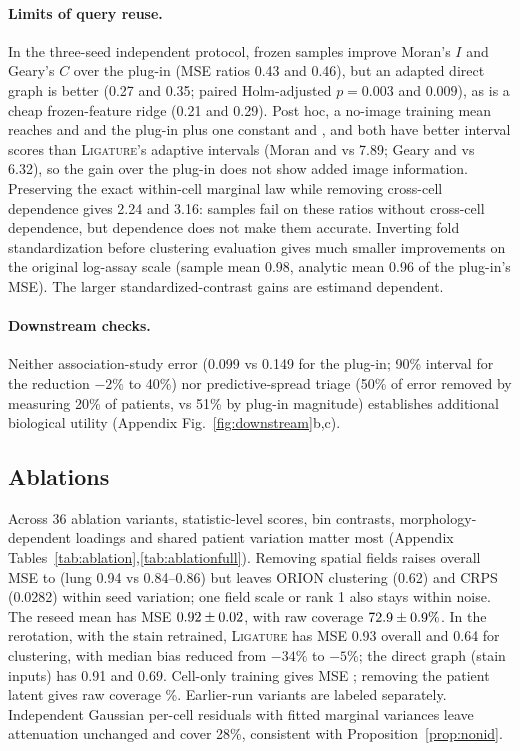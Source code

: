 \documentclass[10pt,letterpaper]{article}
\theoremstyle{definition}
\theoremstyle{remark}
\newcommand{\method}{\textnormal{\textsc{Ligature}}}
\begin{document}
\paragraph{Limits of query reuse.} In the three-seed independent protocol, frozen samples improve Moran's $I$ and Geary's $C$ over the plug-in (MSE ratios 0.43 and 0.46), but an adapted direct graph is better (0.27 and 0.35; paired Holm-adjusted $p=0.003$ and $0.009$), as is a cheap frozen-feature ridge (0.21 and 0.29). Post hoc, a no-image training mean reaches \BaseMoranNoImage{} and \BaseGearyNoImage{} and the plug-in plus one constant \BaseMoranConst{} and \BaseGearyConst{}, and both have better interval scores than \method{}'s adaptive intervals (Moran \BaseMoranNoImageScore{} and \BaseMoranConstScore{} vs 7.89; Geary \BaseGearyNoImageScore{} and \BaseGearyConstScore{} vs 6.32), so the gain over the plug-in does not show added image information. Preserving the exact within-cell marginal law while removing cross-cell dependence gives 2.24 and 3.16: samples fail on these ratios without cross-cell dependence, but dependence does not make them accurate. Inverting fold standardization before clustering evaluation gives much smaller improvements on the original log-assay scale (sample mean 0.98, analytic mean 0.96 of the plug-in's MSE). The larger standardized-contrast gains are estimand dependent.



\paragraph{Downstream checks.} Neither association-study error (0.099 vs 0.149 for the plug-in; 90\% interval for the reduction $-2\%$ to 40\%) nor predictive-spread triage (50\% of error removed by measuring 20\% of patients, vs 51\% by plug-in magnitude) establishes additional biological utility (Appendix Fig.~\ref{fig:downstream}b,c).

\subsection{Ablations}
\label{sec:ablations}


Across 36 ablation variants, statistic-level scores, bin contrasts, morphology-dependent loadings and shared patient variation matter most (Appendix Tables~\ref{tab:ablation},\ref{tab:ablationfull}). Removing spatial fields raises overall MSE to \CurrentNoFieldsMSE{} (lung 0.94 vs 0.84--0.86) but leaves ORION clustering (0.62) and CRPS (0.0282) within seed variation; one field scale or rank 1 also stays within noise. The reseed mean has MSE $0.92\pm0.02$, with raw coverage $72.9\pm0.9\%$. In the rerotation, with the stain retrained, \method{} has MSE 0.93 overall and 0.64 for clustering, with median bias reduced from $-34\%$ to $-5\%$; the direct graph (stain inputs) has 0.91 and 0.69. Cell-only training gives MSE \CurrentCellOnlyMSE{}; removing the patient latent gives raw coverage \CurrentNoPatientCoverage\%. Earlier-run variants are labeled separately. Independent Gaussian per-cell residuals with fitted marginal variances leave attenuation unchanged and cover 28\%, consistent with Proposition~\ref{prop:nonid}.
\end{document}
